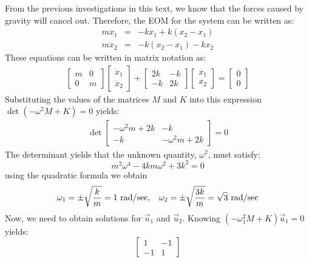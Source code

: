 \documentclass[12pt,letter]{article}
\begin{document}
\begin{example}
	\noindent  From the previous investigations in this text, we know that the forces caused by gravity will cancel out. Therefore, the EOM for the system can be written as:
	\begin{eqnarray}
	m\ddot{x}_1 &= & -kx_1 + k(x_2-x_1) \\
	m\ddot{x}_2&= & -k(x_2-x_1) -kx_2 \nonumber
	\end{eqnarray}
	These equations can be written in matrix notation as:
	\begin{eqnarray}
		\begin{bmatrix} m & 0  \\  0 & m \end{bmatrix}\begin{bmatrix} \ddot{x}_1 \\  \ddot{x}_2 \end{bmatrix} + \begin{bmatrix} 2k & -k  \\  -k & 2k \end{bmatrix}\begin{bmatrix} x_1 \\  x_2 \end{bmatrix} = \begin{bmatrix} 0 \\  0 \end{bmatrix}
	\end{eqnarray}
	Substituting the values of the matrices $M$ and $K$ into this expression $\det(-\omega^2 M  + K) = 0$ yields: 
	\begin{eqnarray}
	\det\begin{bmatrix} -\omega^2 m + 2k & -k  \\  -k & -\omega^2 m + 2k \end{bmatrix}=0
	\end{eqnarray}
	The determinant yields that the unknown quantity, $\omega^2$, must satisfy:
	\begin{equation}
	m^2 \omega^4 - 4km\omega^2 + 3k^2 = 0
	\end{equation}
	using the quadratic formula we obtain
	\begin{equation}
	\omega_1 = \pm \sqrt{\frac{k}{m}}=1 \text{ rad/sec}, \hspace{2ex} \omega_2 = \pm \sqrt{\frac{3k}{m}}=\sqrt{3} \text{ rad/sec}
	\end{equation}
	Now, we need to obtain solutions for $\vec{u}_1$ and $\vec{u}_2$. Knowing $(-\omega_1^2 M  + K)\vec{u}_1 =0$ yields:
	\begin{equation}
		 \begin{bmatrix} 1 & -1 \\    -1  & 1 \end{bmatrix} 

\end{equation}
\end{example}
\end{document}

